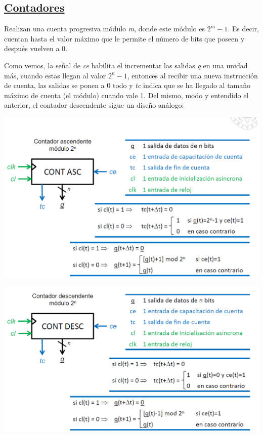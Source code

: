 \documentclass[a4paper,10pt]{book}
\begin{document}
\subsection*{\underline{Contadores}}
Realizan una cuenta progresiva módulo \textit{m}, donde este módulo es $2^m-1$. Es decir, cuentan hasta el valor máximo que le permite el número de bits que poseen y después vuelven a 0.

Como vemos, la señal de \textit{ce} habilita el incrementar las salidas \textit{q} en una unidad más, cuando estas llegan al valor $2^n-1$, entonces al recibir una nueva instrucción de cuenta, las salidas se ponen a 0 todo y \textit{tc} indica que se ha llegado al tamaño máximo de cuenta (el módulo) cuando vale 1. Del mismo, modo y entendido el anterior, el contador descendente sigue un diseño análogo:

\begin{center}
\includegraphics[scale=0.42]{contador ascendente}
\end{center}

\begin{center}
\includegraphics[scale=0.4]{contador descendente}
\end{center}
\end{document}
